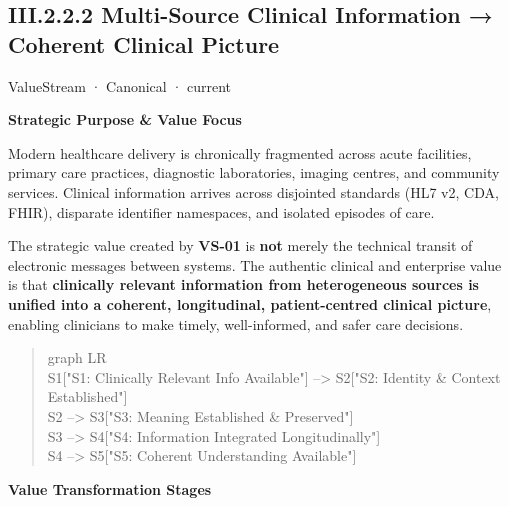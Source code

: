 \subsection*{III.2.2.2 Multi-Source Clinical Information → Coherent Clinical Picture}
\label{navigation:III.2.2.2}

\label{element:01f655eae3d8485699449c3dcf4f9b56}
{\small ValueStream · Canonical · current}\par

\par\medskip\textbf{Strategic Purpose \& Value Focus}\par


Modern healthcare delivery is chronically fragmented across acute facilities, primary care practices, diagnostic laboratories, imaging centres, and community services. Clinical information arrives across disjointed standards (HL7 v2, CDA, FHIR), disparate identifier namespaces, and isolated episodes of care.



The strategic value created by \textbf{VS-01} is \textbf{not} merely the technical transit of electronic messages between systems. The authentic clinical and enterprise value is that \textbf{clinically relevant information from heterogeneous sources is unified into a coherent, longitudinal, patient-centred clinical picture}, enabling clinicians to make timely, well-informed, and safer care decisions.



\begin{quote}\small\ttfamily
graph LR\\
    S1["S1: Clinically Relevant Info Available"] --> S2["S2: Identity \& Context Established"]\\
    S2 --> S3["S3: Meaning Established \& Preserved"]\\
    S3 --> S4["S4: Information Integrated Longitudinally"]\\
    S4 --> S5["S5: Coherent Understanding Available"]\\

\end{quote}


\par\medskip\textbf{Value Transformation Stages}\par


